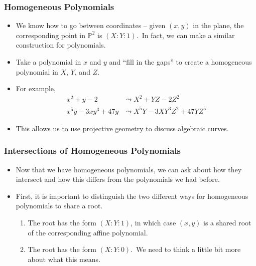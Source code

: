 \documentclass[handout]{beamer}
\begin{document}
\begin{frame}
	\frametitle{Homogeneous Polynomials}
	\begin{itemize}
		\item We know how to go between coordinates -- given $(x, y)$ in the plane, the corresponding point in $\mathbb{P}^2$ is $(X : Y : 1)$.\pause\ In fact, we can make a similar construction for polynomials.
		
		\item\pause Take a polynomial in $x$ and $y$ and  ``fill in the gaps'' to create a homogeneous polynomial in $X$, $Y$, and $Z$.
		
		\item\pause For example,
			\begin{align*}
				x^2 + y - 2 &\leadsto X^2 + YZ - 2Z^2\\
				x^5y - 3xy^3 + 47y &\leadsto X^5Y - 3XY^3Z^2 + 47YZ^5
			\end{align*}
		
		\item\pause This allows us to use projective geometry to discuss algebraic curves.
	\end{itemize}
\end{frame}

\begin{frame}
	\frametitle{Intersections of Homogeneous Polynomials}
	\begin{itemize}
		\item Now that we have homogeneous polynomials, we can ask about how they intersect and how this differs from the polynomials we had before.
		
		\item\pause First, it is important to distinguish the two different ways for homogeneous polynomials to share a root.
			\begin{enumerate}
				\item\pause The root has the form $(X : Y : 1)$, in which case $(x, y)$ is a shared root of the corresponding affine polynomial.
				
				\item\pause The root has the form $(X : Y : 0)$.\pause\ We need to think a little bit more about what this means.
			\end{enumerate}
	\end{itemize}
\end{frame}
\end{document}

